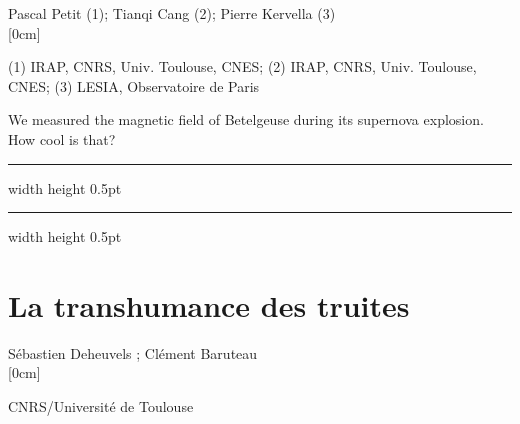 \documentclass[a4paper,11pt]{book}
\def\doubleline{
\hrule width \hsize height 0.5pt  \kern 1mm \hrule width \hsize height 0.5pt 
}
\begin{document}
\begin{center}
{\large Pascal Petit (1)};{ \large  Tianqi Cang (2)};{ \large  Pierre Kervella (3)}\\



[0cm]



  
  
\vspace{2 mm}
\noindent (1) IRAP, CNRS, Univ. Toulouse, CNES; (2)  IRAP, CNRS, Univ. Toulouse, CNES; (3)  LESIA, Observatoire de Paris\\

\end{center}



  
\vspace{2 mm}
\noindent We measured the magnetic field of Betelgeuse during its supernova explosion. How cool is that?

\noindent\doubleline
        
          \section[La transhumance des truites \newline(Sébastien Deheuvels)] { La transhumance des truites }



\begin{center}
{\large Sébastien Deheuvels };{ \large  Clément Baruteau}\\



[0cm]



  
\vspace{2 mm}
\noindent CNRS/Université de Toulouse\\

\end{center}
\end{document}
